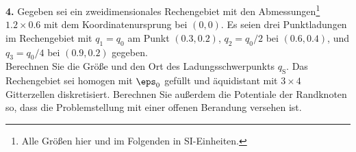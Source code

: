\documentclass[./Protokollheft.tex]{subfiles}
\begin{document}
%

\begin{framed}
	\noindent \textbf{4.} Gegeben sei ein zweidimensionales Rechengebiet mit den
Abmessungen\footnote{Alle Größen hier und im Folgenden in SI-Einheiten.} $1.2\times 0.6$ mit        
dem Koordinatenursprung bei $(0,0)$. Es seien drei Punktladungen im
Rechengebiet mit $q_1=q_0$ am Punkt $(0.3,0.2)$,  $q_2=q_0/2$ bei
$(0.6,0.4)$, und  $q_3=q_0/4$ bei $(0.9,0.2)$ gegeben.\\
Berechnen Sie die Größe und den Ort des Ladungsschwerpunkts $q_{\text{S}}$. Das
Rechengebiet sei homogen mit $\eps_0$ gefüllt und äquidistant mit
$3 \times 4$ Gitterzellen diskretisiert. Berechnen Sie außerdem die
Potentiale der Randknoten so, dass die Problemstellung mit einer
offenen Berandung versehen ist.\label{exer:averagePointCharges}
\end{framed}
\end{document}

